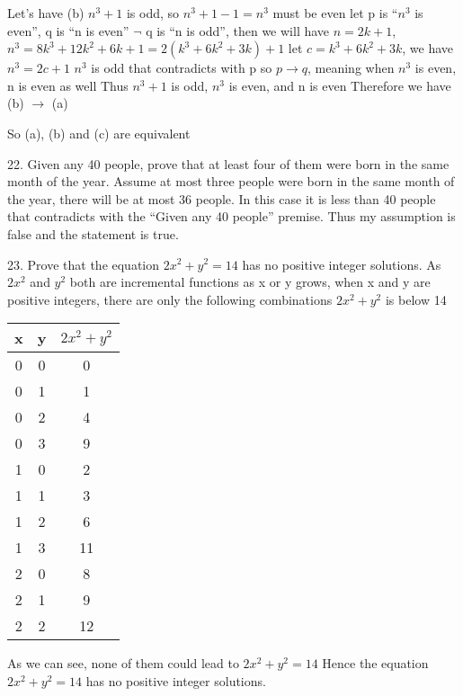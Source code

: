 \documentclass{article}
\begin{document}
Let's have (b) $n^3+1$ is odd, so $n^3 + 1 - 1 = n^3$ must be even
let p is ``$n^3$ is even'', q is ``n is even''
$\lnot$ q is ``n is odd'', then we will have $n = 2k+1$, $n^3 = 8k^3 + 12k^2 + 6k + 1 = 2(k^3 + 6k^2 + 3k) + 1$
let $c = k^3 + 6k^2 + 3k$, we have $n^3 = 2c + 1$
$n^3$ is odd that contradicts with p
so $p\to q$, meaning when $n^3$ is even, n is even as well
Thus $n^3+1$ is odd, $n^3$ is even, and n is even
Therefore we have (b) $\to$ (a)

So (a), (b) and (c) are equivalent

22. Given any 40 people, prove that at least four of them were born in the same month of the year.
Assume at most three people were born in the same month of the year, there will be at most 36 people. In this case it is less than 40 people that contradicts with the ``Given any 40 people'' premise. 
Thus my assumption is false and the statement is true.

23. Prove that the equation $2x^2+y^2=14$ has no positive integer solutions.
As $2x^2$ and $y^2$ both are incremental functions as x or y grows,
when x and y are positive integers, there are only the following combinations $2x^2 + y^2$ is below 14

\begin{tabular}{|c|c|c|}
\hline
x & y & $2x^2 + y^2$ \\
\hline
0 & 0 &  0\\
\hline
0  &1 &  1\\
\hline
0 & 2&   4 \\
\hline
0  &3 &  9 \\
\hline
1  & 0  & 2 \\
\hline
1 & 1 &  3 \\
\hline
1&  2  & 6  \\
\hline
1 & 3 & 11 \\
\hline
2 & 0 &  8 \\
\hline
2 & 1 &  9 \\
\hline
2 & 2&  12 \\
\hline
\end{tabular}

As we can see, none of them could lead to $2x^2+y^2=14$
Hence the equation $2x^2+y^2=14$ has no positive integer solutions.
\end{document}
